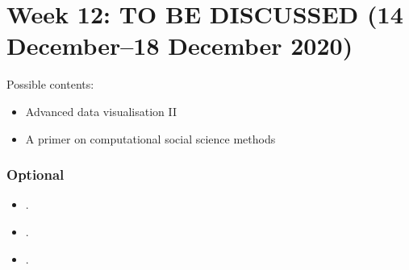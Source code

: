 \documentclass[abstract=on,parskip=full,headings=standardclasses,fontsize=11pt,paper=a4]{scrartcl}
\begin{document}
\section{Week 12: TO BE DISCUSSED  (14 December--18 December 2020)}


Possible contents: 

\begin{itemize}
\item Advanced data visualisation II 
\item A primer on computational social science methods
\end{itemize}


\subsubsection*{Optional}
\begin{itemize}
\item {}.
\item {}.
\item {}.
\end{itemize}



\end{document}
